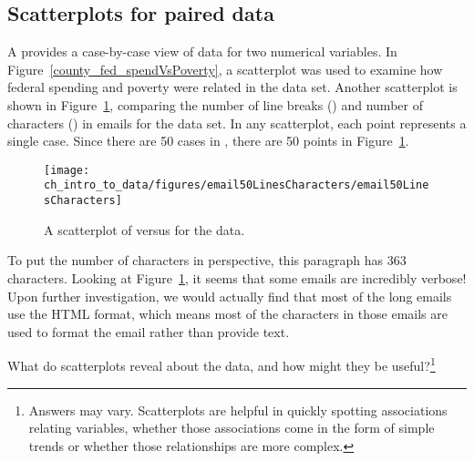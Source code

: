 \subsection{Scatterplots for paired data}
\label{scatterPlots}


A  provides a case-by-case view of data for two numerical variables. In Figure~\vref{county_fed_spendVsPoverty}, a scatterplot was used to examine how federal spending and poverty were related in the  data set. Another scatterplot is shown in Figure~\ref{email50LinesCharacters}, comparing the number of line breaks () and number of characters () in emails for the  data set. In any scatterplot, each point represents a single case. Since there are 50 cases in , there are 50 points in Figure~\ref{email50LinesCharacters}.

\textC{\setlength{\captionwidth}{0.9\textwidth}}

\begin{figure}[h]
   \centering
   \texttt{[image: ch\_intro\_to\_data/figures/email50LinesCharacters/email50LinesCharacters]}
   \caption{A scatterplot of  versus  for the  data.}
   \label{email50LinesCharacters}
\end{figure}

\textC{\setlength{\captionwidth}{\mycaptionwidth}}

To put the number of characters in perspective, this paragraph has 363 characters. Looking at Figure~\ref{email50LinesCharacters}, it seems that some emails are incredibly verbose! Upon further investigation, we would actually find that most of the long emails use the HTML format, which means most of the characters in those emails are used to format the email rather than provide text.

\begin{exercise}
What do scatterplots reveal about the data, and how might they be useful?\footnote{Answers may vary. Scatterplots are helpful in quickly spotting associations relating variables, whether those associations come in the form of simple trends or whether those relationships are more complex.}
\end{exercise}

